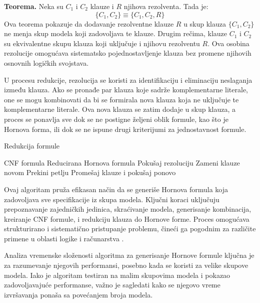 \documentclass[12pt,oneside]{memoir}
\begin{document}
\textbf{Teorema.} Neka su \( C_1 \) i \( C_2 \) klauze i \( R \) njihova rezolventa. Tada je:
\[
\{C_1, C_2\} \equiv \{C_1, C_2, R\}
\]
Ova teorema pokazuje da dodavanje rezolventne klauze \( R \) u skup klauza \( \{C_1, C_2\} \) ne menja skup modela koji zadovoljava te klauze. Drugim rečima, klauze \( C_1 \) i \( C_2 \) su ekvivalentne skupu klauza koji uključuje i njihovu rezolventu \( R \). Ova osobina rezolucije omogućava sistematsko pojednostavljenje klauza bez promene njihovih osnovnih logičkih svojstava.


U procesu redukcije, rezolucija se koristi za identifikaciju i eliminaciju neslaganja između klauza. Ako se pronađe par klauza koje sadrže komplementarne literale, one se mogu kombinovati da bi se formirala nova klauza koja ne uključuje te komplementarne literale. Ova nova klauza se zatim dodaje u skup klauza, a proces se ponavlja sve dok se ne postigne željeni oblik formule, kao što je Hornova forma, ili dok se ne ispune drugi kriterijumi za jednostavnost formule.

\begin{algorithm}
\caption{Redukcija formule}
\renewcommand{\algorithmicrequire}{\textbf{Input:}}
\renewcommand{\algorithmicensure}{\textbf{Output:}}
\begin{algorithmic}[1]
\REQUIRE CNF formula
\ENSURE Reducirana Hornova formula
        \STATE Pokušaj rezoluciju
            \STATE Zameni klauze novom
            \STATE Prekini petlju
        \ENDIF
    \ENDFOR
        \STATE Promešaj klauze i pokušaj ponovo
    \ENDIF
\ENDWHILE
\end{algorithmic}
\end{algorithm}
\newpage

Ovaj algoritam pruža efikasan način da se generiše Hornova formula koja zadovoljava sve specifikacije iz skupa modela. Ključni koraci uključuju prepoznavanje zajedničkih jedinica, skraćivanje modela, generisanje kombinacija, kreiranje CNF formule, i redukciju klauza do Hornove forme. Proces omogućava strukturirano i sistematično pristupanje problemu, čineći ga pogodnim za različite primene u oblasti logike i računarstva \cite{russell}.


Analiza vremenske složenosti algoritma za generisanje Hornove formule ključna je za razumevanje njegovih performansi, posebno kada se koristi za velike skupove modela. Iako je algoritam testiran na malim skupovima modela i pokazao zadovoljavajuće performanse, važno je sagledati kako se njegovo vreme izvršavanja ponaša sa povećanjem broja modela.
\end{document}
